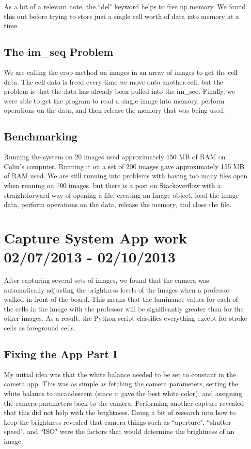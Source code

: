 \documentclass[]{article}
\begin{document}
			As a bit of a relevant note, the ``del" keyword helps to free up memory. We found this out before trying to store just a single cell worth of data into memory at a time.
			
		\subsection{The im\_seq Problem}
			We are calling the crop method on images in an array of images to get the cell data. The cell data is freed every time we move onto another cell, but the problem is that the data has already been pulled into the im\_seq. Finally, we were able to get the program to read a single image into memory, perform operations on the data, and then release the memory that was being used. 
			
		\subsection{Benchmarking}
			Running the system on 20 images used approximately 150 MB of RAM on Colin's computer. Running it on a set of 200 images gave approximately 155 MB of RAM used. We are still running into problems with having too many files open when running on 700 images, but there is a post on Stackoverflow with a straightforward way of opening a file, creating an Image object, load the image data, perform operations on the data, release the memory, and close the file. 
	
	\section{Capture System App work 02/07/2013 - 02/10/2013}
		After capturing several sets of images, we found that the camera was automatically adjusting the brightness levels of the images when a professor walked in front of the board. This means that the luminance values for each of the cells in the image with the professor will be significantly greater than for the other images. As a result, the Python script classifies everything except for stroke cells as foreground cells.
		
		\subsection{Fixing the App Part I}
			My initial idea was that the white balance needed to be set to constant in the camera app. This was as simple as fetching the camera parameters, setting the white balance to incandescent (since it gave the best white color), and assigning the camera parameters back to the camera. Performing another capture revealed that this did not help with the brightness. Doing a bit of research into how to keep the brightness revealed that camera things such as ``aperture", ``shutter speed", and ``ISO" were the factors that would determine the brightness of an image. 
			
\end{document}
